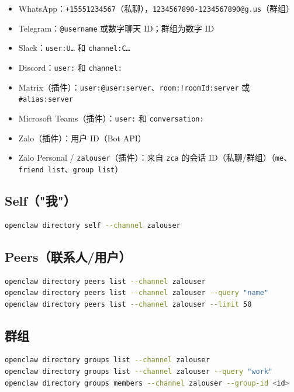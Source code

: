 \begin{itemize}
  \item WhatsApp：\texttt{+15551234567}（私聊），\texttt{1234567890-1234567890@g.us}（群组）
  \item Telegram：\texttt{@username} 或数字聊天 ID；群组为数字 ID
  \item Slack：\texttt{user:U…} 和 \texttt{channel:C…}
  \item Discord：\texttt{user:} 和 \texttt{channel:}
  \item Matrix（插件）：\texttt{user:@user:server}、\texttt{room:!roomId:server} 或 \texttt{\#alias:server}
  \item Microsoft Teams（插件）：\texttt{user:} 和 \texttt{conversation:}
  \item Zalo（插件）：用户 ID（Bot API）
  \item Zalo Personal / \texttt{zalouser}（插件）：来自 \texttt{zca} 的会话 ID（私聊/群组）（\texttt{me}、\texttt{friend list}、\texttt{group list}）
\end{itemize}


\subsection{Self（"我"）}


\begin{lstlisting}[language=bash]
openclaw directory self --channel zalouser
\end{lstlisting}


\subsection{Peers（联系人/用户）}


\begin{lstlisting}[language=bash]
openclaw directory peers list --channel zalouser
openclaw directory peers list --channel zalouser --query "name"
openclaw directory peers list --channel zalouser --limit 50
\end{lstlisting}


\subsection{群组}


\begin{lstlisting}[language=bash]
openclaw directory groups list --channel zalouser
openclaw directory groups list --channel zalouser --query "work"
openclaw directory groups members --channel zalouser --group-id <id>
\end{lstlisting}



